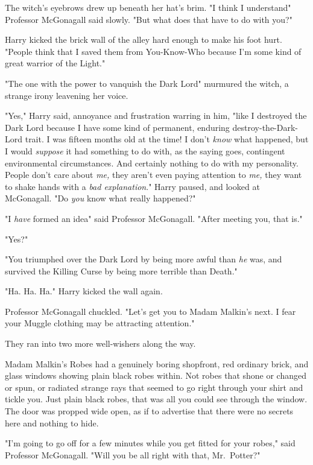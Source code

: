 The witch's eyebrows drew up beneath her hat's brim. "I think I
understand{\el}" Professor McGonagall said slowly. "But what does that have
to do with you?"

Harry kicked the brick wall of the alley hard enough to make his foot hurt.
"People think that I saved them from You-Know-Who because I'm some kind of
great warrior of the Light."

"The one with the power to vanquish the Dark Lord{\el}" murmured the witch,
a strange irony leavening her voice.

"Yes," Harry said, annoyance and frustration warring in him, "like I destroyed
the Dark Lord because I have some kind of permanent, enduring
destroy-the-Dark-Lord trait. I was fifteen months old at the time! I don't
\emph{know} what happened, but I would \emph{suppose} it had something to do
with, as the saying goes, contingent environmental circumstances. And certainly
nothing to do with my personality. People don't care about \emph{me,} they
aren't even paying attention to \emph{me,} they want to shake hands with a
\emph{bad explanation}." Harry paused, and looked at McGonagall. "Do \emph{you}
know what really happened?"

"I \emph{have} formed an idea{\el}" said Professor McGonagall. "After
meeting you, that is."

"Yes?"

"You triumphed over the Dark Lord by being more awful than \emph{he} was, and
survived the Killing Curse by being more terrible than Death."

"Ha. Ha. Ha." Harry kicked the wall again.

Professor McGonagall chuckled. "Let's get you to Madam Malkin's next. I fear
your Muggle clothing may be attracting attention."

They ran into two more well-wishers along the way.

Madam Malkin's Robes had a genuinely boring shopfront, red ordinary brick, and
glass windows showing plain black robes within. Not robes that shone or changed
or spun, or radiated strange rays that seemed to go right through your shirt
and tickle you. Just plain black robes, that was all you could see through the
window. The door was propped wide open, as if to advertise that there were no
secrets here and nothing to hide.

"I'm going to go off for a few minutes while you get fitted for your robes,"
said Professor McGonagall. "Will you be all right with that, Mr.~Potter?"

